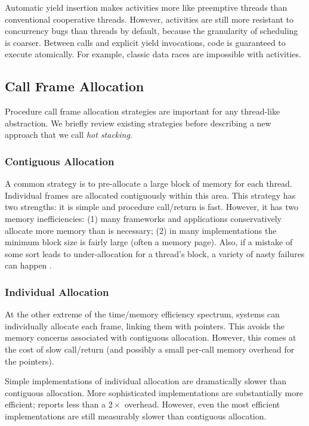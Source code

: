 \documentclass[acmsmall,anonymous,review]{acmart}\settopmatter{printfolios=true,printccs=false,printacmref=false}
\begin{document}
Automatic yield insertion makes activities more like preemptive threads than conventional cooperative threads.
However, activities are still more resistant to concurrency bugs than threads by default, because the granularity of scheduling is coarser.
Between calls and explicit yield invocations, code is guaranteed to execute atomically.
For example, classic data races are impossible with activities.




\subsection{Call Frame Allocation}
\label{sec:hot_stacking}

Procedure call frame allocation strategies are important for any thread-like abstraction.
We briefly review existing strategies before describing a new approach that we call \emph{hot stacking}.

\subsubsection{Contiguous Allocation}

A common strategy is to pre-allocate a large block of memory for each thread.
Individual frames are allocated contiguously within this area.
This strategy has two strengths: it is simple and procedure call/return is fast.
However, it has two memory inefficiencies: (1) many frameworks and applications conservatively allocate more memory than is necessary; (2) in many implementations the minimum block size is fairly large (often a memory page).
Also, if a mistake of some sort leads to under-allocation for a thread's block, a variety of nasty failures can happen \cite{Spolsky2008}.

\subsubsection{Individual Allocation}

At the other extreme of the time/memory efficiency spectrum, systems can individually allocate each frame, linking them with pointers.
This avoids the memory concerns associated with contiguous allocation.
However, this comes at the cost of slow call/return (and possibly a small per-call memory overhead for the pointers).

Simple implementations of individual allocation are dramatically slower than contiguous allocation.
More sophisticated implementations are substantially more efficient; \cite{Shao2000} reports less than a $2\times$ overhead.
However, even the most efficient implementations are still measurably slower than contiguous allocation.
\end{document}
